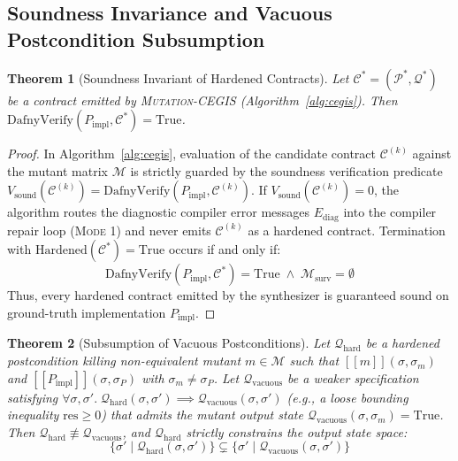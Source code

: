 \documentclass{article}
\providecommand{\llbracket}{[\![}
\providecommand{\rrbracket}{]\!]}
\newtheorem{theorem}{Theorem}
\begin{document}
\subsection{Soundness Invariance and Vacuous Postcondition Subsumption}

\begin{theorem}[Soundness Invariant of Hardened Contracts]
\label{thm:soundness_invariant}
Let $\mathcal{C}^* = (\mathcal{P}^*, \mathcal{Q}^*)$ be a contract emitted by \textsc{Mutation-CEGIS} (Algorithm~\ref{alg:cegis}). Then $\text{DafnyVerify}(P_{\text{impl}}, \mathcal{C}^*) = \text{True}$.
\end{theorem}

\begin{proof}
In Algorithm~\ref{alg:cegis}, evaluation of the candidate contract $\mathcal{C}^{(k)}$ against the mutant matrix $\mathcal{M}$ is strictly guarded by the soundness verification predicate $V_{\text{sound}}(\mathcal{C}^{(k)}) = \text{DafnyVerify}(P_{\text{impl}}, \mathcal{C}^{(k)})$. If $V_{\text{sound}}(\mathcal{C}^{(k)}) = 0$, the algorithm routes the diagnostic compiler error messages $E_{\text{diag}}$ into the compiler repair loop (\textsc{Mode 1}) and never emits $\mathcal{C}^{(k)}$ as a hardened contract. Termination with $\text{Hardened}(\mathcal{C}^*) = \text{True}$ occurs if and only if:
\begin{equation}
\text{DafnyVerify}(P_{\text{impl}}, \mathcal{C}^*) = \text{True} \;\land\; \mathcal{M}_{\text{surv}} = \emptyset
\end{equation}
Thus, every hardened contract emitted by the synthesizer is guaranteed sound on ground-truth implementation $P_{\text{impl}}$.
\end{proof}

\begin{theorem}[Subsumption of Vacuous Postconditions]
\label{thm:vacuous_subsumption}
Let $\mathcal{Q}_{\text{hard}}$ be a hardened postcondition killing non-equivalent mutant $m \in \mathcal{M}$ such that $\llbracket m \rrbracket(\sigma, \sigma_m)$ and $\llbracket P_{\text{impl}} \rrbracket(\sigma, \sigma_P)$ with $\sigma_m \neq \sigma_P$. Let $\mathcal{Q}_{\text{vacuous}}$ be a weaker specification satisfying $\forall \sigma, \sigma'. \; \mathcal{Q}_{\text{hard}}(\sigma, \sigma') \implies \mathcal{Q}_{\text{vacuous}}(\sigma, \sigma')$ (e.g., a loose bounding inequality $\text{res} \ge 0$) that admits the mutant output state $\mathcal{Q}_{\text{vacuous}}(\sigma, \sigma_m) = \text{True}$. Then $\mathcal{Q}_{\text{hard}} \not\equiv \mathcal{Q}_{\text{vacuous}}$, and $\mathcal{Q}_{\text{hard}}$ strictly constrains the output state space:
\begin{equation}
\{\sigma' \mid \mathcal{Q}_{\text{hard}}(\sigma, \sigma')\} \subsetneq \{\sigma' \mid \mathcal{Q}_{\text{vacuous}}(\sigma, \sigma')\}
\end{equation}
\end{theorem}
\end{document}
